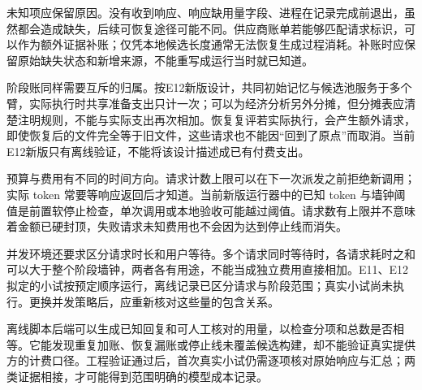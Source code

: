 未知项应保留原因。没有收到响应、响应缺用量字段、进程在记录完成前退出，虽然都会造成缺失，后续可恢复途径可能不同。供应商账单若能够匹配请求标识，可以作为额外证据补账；仅凭本地候选长度通常无法恢复生成过程消耗。补账时应保留原始缺失状态和新增来源，不能重写成运行当时就已知道。

阶段账同样需要互斥的归属。按E12新版设计，共同初始记忆与候选池服务于多个臂，实际执行时共享准备支出只计一次；可以为经济分析另外分摊，但分摊表应清楚注明规则，不能与实际支出再次相加。恢复复评若实际执行，会产生额外请求，即使恢复后的文件完全等于旧文件，这些请求也不能因“回到了原点”而取消。当前E12新版只有离线验证，不能将该设计描述成已有付费支出。

预算与费用有不同的时间方向。请求计数上限可以在下一次派发之前拒绝新调用；实际 token 常要等响应返回后才知道。当前新版运行器中的已知 token 与墙钟阈值是前置软停止检查，单次调用或本地验收可能越过阈值。请求数有上限并不意味着金额已硬封顶，失败请求未知费用也不会因为达到停止线而消失。

并发环境还要求区分请求时长和用户等待。多个请求同时等待时，各请求耗时之和可以大于整个阶段墙钟，两者各有用途，不能当成独立费用直接相加。E11、E12拟定的小试按预定顺序运行，离线记录已区分请求与阶段范围；真实小试尚未执行。更换并发策略后，应重新核对这些量的包含关系。

离线脚本后端可以生成已知回复和可人工核对的用量，以检查分项和总数是否相等。它能发现重复加账、恢复漏账或停止线未覆盖候选构建，却不能验证真实提供方的计费口径。工程验证通过后，首次真实小试仍需逐项核对原始响应与汇总；两类证据相接，才可能得到范围明确的模型成本记录。
